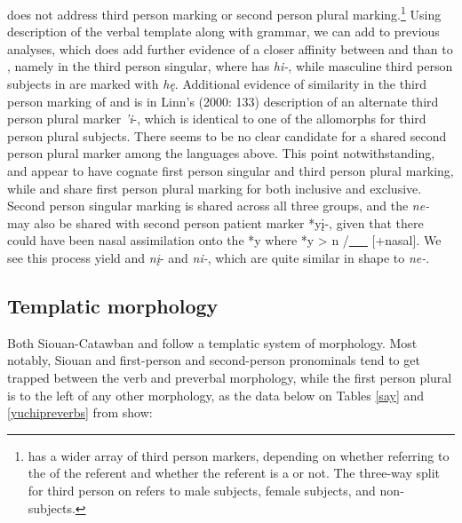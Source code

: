 \documentclass[output=paper]{LSP/langsci}
\begin{document}
\citet{Rankin1998scy} does not address third person marking or second person plural marking.\footnote{ has a wider array of third person markers, depending on whether referring to the  of the referent and whether the referent is a  or not. The three-way split for third person on  refers to male  subjects, female  subjects, and non- subjects.} Using  description of the  verbal template along with   grammar, we can add to previous analyses, which does add further evidence of a closer affinity between  and  than to , namely in the third person singular, where  has \emph{hi-}, while masculine third person subjects in  are marked with \emph{h\k{e}}. Additional evidence of similarity in the third person marking of  and  is in Linn's (2000: 133) description of an alternate third person plural marker \emph{'i}-, which is identical to one of the  allomorphs for third person plural subjects. There seems to be no clear candidate for a shared second person plural marker among the languages above. This point notwithstanding,  and  appear to have cognate first person singular and third person plural marking, while  and  share first person plural marking for both inclusive and exclusive. Second person singular marking is shared across all three groups, and the  \emph{ne-} may also be shared with  second person patient marker *y\k{i}-, given that there could have been nasal assimilation onto the *y where *y > n /\underline{~~~} [+nasal]. We see this process yield  and  \emph{n\k{i}}- and  \emph{ni-}, which are quite similar in shape to  \emph{ne-}.

\subsection{Templatic morphology}

Both Siouan-Catawban and  follow a templatic system of morphology. Most notably, Siouan and  first-person and second-person pronominals tend to get trapped between the verb and preverbal morphology, while the first person plural is to the left of any other morphology, as the data below on Tables \ref{say} and \ref{yuchipreverbs} from \citet{Rankin1998scy} show:
\end{document}
